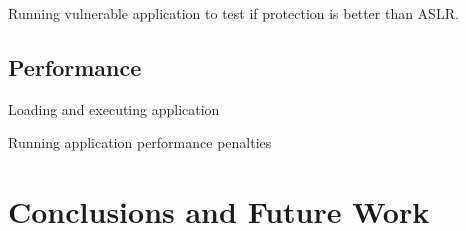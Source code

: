 \documentclass[11pt,final,conference,a4paper]{IEEEtran}
\begin{document}
Running vulnerable application to test if protection is better than ASLR.

\subsection{Performance}

Loading and executing application

Running application performance penalties

\section{Conclusions and Future Work}
\label{sec:conclusions}




\nocite{arscryptolocker}
\end{document}
